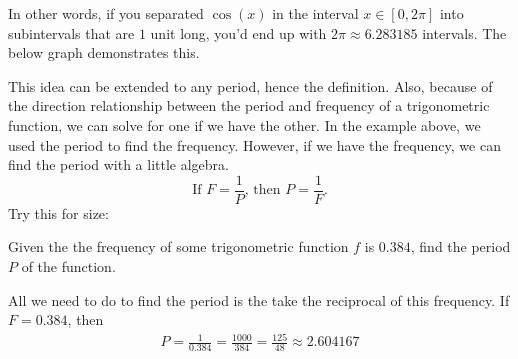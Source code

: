 In other words, if you separated $\cos(x)$ in the interval $x \in [0, 2\pi]$ into subintervals that are $1$ unit long, you'd end up with $2\pi \approx 6.283185$ intervals. The below graph demonstrates this.
\begin{center}
\end{center}
This idea can be extended to any period, hence the definition. Also, because of the direction relationship between the period and frequency of a trigonometric function, we can solve for one if we have the other.
\clearpage
In the example above, we used the period to find the frequency. However, if we have the frequency, we can find the period with a little algebra.
\[
    \text{If } F = \frac{1}{P}\text{, then } P = \frac{1}{F} \text{.}
\]
Try this for size:
\begin{problem}
    Given the the frequency of some trigonometric function $f$ is $0.384$, find the period $P$ of the function.
\end{problem}
\begin{solution}
    All we need to do to find the period is the take the reciprocal of this frequency. If $F = 0.384$, then
    \begin{align*}
        P = \frac{1}{0.384} = \frac{1000}{384} = \frac{125}{48} \approx 2.604167
    \end{align*}
\end{solution}
